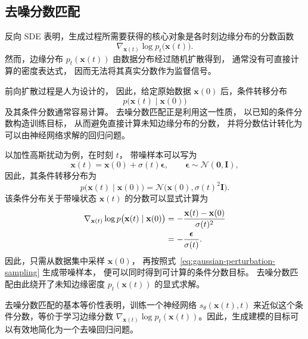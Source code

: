 \subsection{去噪分数匹配}


反向 SDE 表明，生成过程所需要获得的核心对象是各时刻边缘分布的分数函数
\[
    \nabla_{\mathbf{x}(t)}
    \log p_t\bigl(\mathbf{x}(t)\bigr).
\]
然而，边缘分布
\(p_t(\mathbf{x}(t))\)
由数据分布经过随机扩散得到，
通常没有可直接计算的密度表达式，
因而无法将其真实分数作为监督信号。

前向扩散过程是人为设计的，
因此，给定原始数据
\(\mathbf{x}(0)\)
后，条件转移分布
\[
    p\bigl(\mathbf{x}(t)\mid\mathbf{x}(0)\bigr)
\]
及其条件分数通常容易计算。
去噪分数匹配正是利用这一性质，
以已知的条件分数构造训练目标，
从而避免直接计算未知边缘分布的分数，
并将分数估计转化为可以由神经网络求解的回归问题。

以加性高斯扰动为例，在时刻 \(t\)，
带噪样本可以写为
\begin{equation}
    \mathbf{x}(t)
    =
    \mathbf{x}(0)
    +
    \sigma(t)\boldsymbol{\epsilon},
    \qquad
    \boldsymbol{\epsilon}
    \sim
    \mathcal{N}(\mathbf{0},\mathbf{I}),
    \label{eq:gaussian-perturbation-sampling}
\end{equation}
因此，其条件转移分布为
\begin{equation}
    p\bigl(\mathbf{x}(t)\mid\mathbf{x}(0)\bigr)
    =
    \mathcal{N}
    \bigl(
        \mathbf{x}(0),
        \sigma(t)^2\mathbf{I}
    \bigr).
    \label{eq:gaussian-perturbation-kernel}
\end{equation}
该条件分布关于带噪状态
\(\mathbf{x}(t)\)
的分数可以显式计算为
\begin{align}
    \nabla_{\mathbf{x}(t)}
    \log
    p\bigl(\mathbf{x}(t)\mid\mathbf{x}(0)\bigr)
    &=
    -
    \frac{
        \mathbf{x}(t)-\mathbf{x}(0)
    }{
        \sigma(t)^2
    }
    \notag\\
    &=
    -
    \frac{
        \boldsymbol{\epsilon}
    }{
        \sigma(t)
    }.
    \label{eq:gaussian-conditional-score}
\end{align}
因此，只需从数据集中采样
\(\mathbf{x}(0)\)，
再按照式~\eqref{eq:gaussian-perturbation-sampling}
生成带噪样本，
便可以同时得到可计算的条件分数目标。
去噪分数匹配由此绕开了未知边缘密度
\(p_t(\mathbf{x}(t))\)
的显式求解。

去噪分数匹配的基本等价性表明，训练一个神经网络 $s_\theta(\mathbf{x}(t), t)$ 来近似这个条件分数，等价于学习边缘分数 $\nabla_{\mathbf{x}(t)} \log p_t(\mathbf{x}(t))$。因此，生成建模的目标可以有效地简化为一个去噪回归问题。

